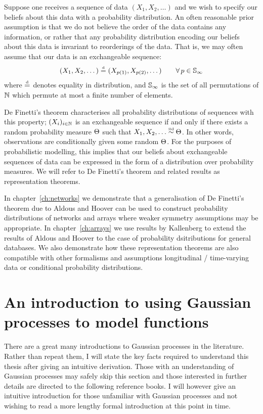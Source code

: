 Suppose one receives a sequence of data $(X_1, X_2, \dots)$ and we wish to specify our beliefs about this data with a probability distribution.
An often reasonable prior assumption is that we do not believe the order of the data contains any information, or rather that any probability distribution encoding our beliefs about this data is invariant to reorderings of the data.
That is, we may often assume that our data is an exchangeable sequence:
\[
  \label{eq:intro:exch}
  (X_1, X_2, \dots) \stackrel{\mbox{\tiny d}}{=} (X_{p(1)}, X_{p(2)}, \dots) \qquad \forall\, p\in\mathbb{S}_{\infty}
\]
where $\stackrel{\mbox{\tiny d}}{=}$ denotes equality in distribution, and $\mathbb{S}_{\infty}$ is the set of all permutations of $\mathbb{N}$ which permute at most a finite number of elements.

De Finetti's theorem \citep[e.g.][]{Kallenberg:2005} characterises all probability distributions of sequences with this property;  $(X_i)_{i\in\mathbb{N}}$ is an exchangeable sequence if and only if there exists a random probability measure $\Theta$ such that $X_1,X_2,\ldots\overset{\mbox{\tiny iid}}{\sim}\Theta$.
In other words, observations are conditionally \iid given some random $\Theta$.
For the purposes of probabilistic modelling, this implies that our beliefs about exchangeable sequences of data can be expressed in the form of a distribution over probability measures.
We will refer to De Finetti's theorem and related results as representation theorems. 

In chapter~\ref{ch:networks} we demonstrate that a generalisation of De Finetti's theorem due to Aldous and Hoover can be used to construct probability distributions of networks and arrays where weaker symmetry assumptions may be appropriate.
In chapter~\ref{ch:arrays} we use results by Kallenberg to extend the results of Aldous and Hoover to the case of probability dsitributions for general databases.
We also demonstrate how these representation theorems are also compatible with other formalisms and assumptions \eg longitudinal / time-varying data or conditional probability distributions.

\section{An introduction to using Gaussian processes to model functions}

There are a great many introductions to Gaussian processes in the literature.
Rather than repeat them, I will state the key facts required to understand this thesis after giving an intuitive derivation.
Those with an understanding of Gaussian processes may safely skip this section and those interested in further details are directed to the following reference books.
I will however give an intuitive introduction for those unfamiliar with Gaussian processes and not wishing to read a more lengthy formal introduction at this point in time.

